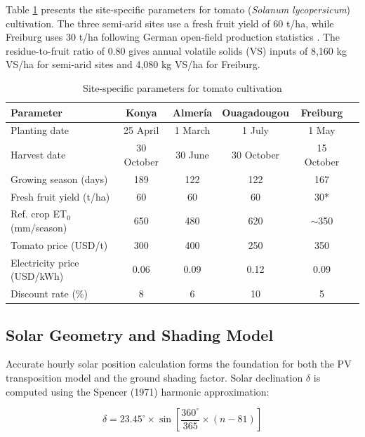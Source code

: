 \documentclass[12pt, a4paper]{article}
\begin{document}
\hspace{1cm}Table \ref{tab:crop} presents the site-specific parameters for tomato (\textit{Solanum lycopersicum}) cultivation. The three semi-arid sites use a fresh fruit yield of 60 t/ha, while Freiburg uses 30 t/ha following German open-field production statistics \cite{dlg2023}. The residue-to-fruit ratio of 0.80 \cite{mohammedi2023} gives annual volatile solids (VS) inputs of 8,160 kg VS/ha for semi-arid sites and 4,080 kg VS/ha for Freiburg.

\begin{table}[H]
\small
\caption{Site-specific parameters for tomato cultivation}
\centering
\begin{tabular}{lccccc}
\toprule
\textbf{Parameter} & \textbf{Konya} & \textbf{Almería} & \textbf{Ouagadougou} & \textbf{Freiburg} \\
\midrule
Planting date & 25 April & 1 March & 1 July & 1 May \\
Harvest date & 30 October & 30 June & 30 October & 15 October \\
Growing season (days) & 189 & 122 & 122 & 167 \\
Fresh fruit yield (t/ha) & 60 & 60 & 60 & 30* \\
Ref. crop ET$_0$ (mm/season) & 650 & 480 & 620 & $\sim$350 \\
Tomato price (USD/t) & 300 & 400 & 250 & 350 \\
Electricity price (USD/kWh) & 0.06 & 0.09 & 0.12 & 0.09 \\
Discount rate (\%) & 8 & 6 & 10 & 5 \\
\bottomrule
\end{tabular}
\label{tab:crop}
\end{table}

\subsection{Solar Geometry and Shading Model}

\hspace{1cm}Accurate hourly solar position calculation forms the foundation for both the PV transposition model and the ground shading factor. Solar declination $\delta$ is computed using the Spencer (1971) harmonic approximation:

\begin{equation}
\delta = 23.45^\circ \times \sin\left[\frac{360^\circ}{365} \times (n - 81)\right]
\label{eq:declination}
\end{equation}
\end{document}
